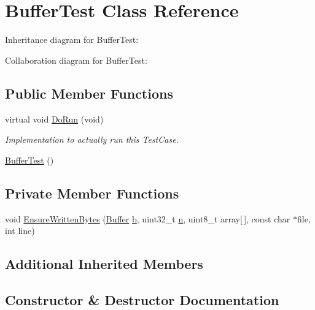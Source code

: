 \hypertarget{classBufferTest}{}\section{Buffer\+Test Class Reference}
\label{classBufferTest}


Inheritance diagram for Buffer\+Test\+:


Collaboration diagram for Buffer\+Test\+:
\subsection*{Public Member Functions}
\begin{DoxyCompactItemize}
\item 
virtual void \hyperlink{classBufferTest_a4ffd025f50c962366167daef7df0ac58}{Do\+Run} (void)
\begin{DoxyCompactList}\small\item\em Implementation to actually run this Test\+Case. \end{DoxyCompactList}\item 
\hyperlink{classBufferTest_ad54a22df69092315fefc6d563a94da35}{Buffer\+Test} ()
\end{DoxyCompactItemize}
\subsection*{Private Member Functions}
\begin{DoxyCompactItemize}
\item 
void \hyperlink{classBufferTest_a482291760a8b3a0716e1a28bb51e7a69}{Ensure\+Written\+Bytes} (\hyperlink{classns3_1_1Buffer}{Buffer} \hyperlink{lte__pathloss_8m_a21ad0bd836b90d08f4cf640b4c298e7c}{b}, uint32\+\_\+t \hyperlink{lte__link__budget__x2__handover__measures_8m_abdb05bc5a064cf642a06c83b3392f148}{n}, uint8\+\_\+t array\mbox{[}$\,$\mbox{]}, const char $\ast$file, int line)
\end{DoxyCompactItemize}
\subsection*{Additional Inherited Members}


\subsection{Constructor \& Destructor Documentation}
